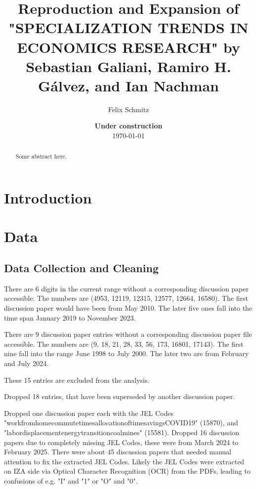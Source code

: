 \documentclass[11pt, a4paper, leqno]{article}
\begin{document}
\title{Reproduction and Expansion of \\"SPECIALIZATION TRENDS IN ECONOMICS RESEARCH" by Sebastian Galiani, Ramiro H. Gálvez, and Ian Nachman}

\author{Felix Schmitz}

\date{
    {\bf Under construction}
    \\[1ex]
    \today
}

\maketitle
{}

\begin{abstract}
    Some abstract here.
\end{abstract}

\clearpage

\section{Introduction}

\section{Data}

\subsection{Data Collection and Cleaning}

There are 6 digits in the current range without a corresponding discussion paper accessible.
The numbers are (4953, 12119, 12315, 12577, 12664, 16580).
The first discussion paper would have been from May 2010.
The later five ones fall into the time span January 2019 to November 2023.

There are 9 discussion paper entries without a corresponding discussion paper file accessible.
The numbers are (9, 18, 21, 28, 33, 56, 173, 16801, 17143).
The first nine fall into the range June 1998 to July 2000.
The later two are from February and July 2024.

These 15 entries are excluded from the analysis.

Dropped 18 entries, that have been superseded by another discussion paper.

Dropped one discussion paper each with the JEL Codes "workfromhomecommutetimesallocationoftimesavingsCOVID19" (15870), and
"labordisplacementenergytransitioncoalmines" (15581).
Dropped 16 discussion papers due to completely missing JEL Codes, these were from March 2024 to February 2025.
There were about 45 discussion papers that needed manual attention to fix the extracted JEL Codes.
Likely the JEL Codes were extracted on IZA side via Optical Character Recognition (OCR) from the PDFs, leading to confusions of e.g. "I" and "1" or "O" and "0".

\clearpage
\end{document}
